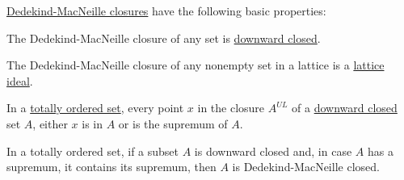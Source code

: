 \begin{proposition}\label{thm:def:dedekind_macnielle_closure}
  \hyperref[def:dedekind_macnielle_completion]{Dedekind-MacNeille closures} have the following basic properties:
  \begin{thmenum}
     The Dedekind-MacNeille closure of any set is \hyperref[def:closed_ordered_subset]{downward closed}.

     The Dedekind-MacNeille closure of any nonempty set in a lattice is a \hyperref[def:lattice_ideal]{lattice ideal}.

     In a \hyperref[def:totally_ordered_set]{totally ordered set}, every point \( x \) in the closure \( A^{UL} \) of a \hyperref[def:closed_ordered_subset]{downward closed} set \( A \), either \( x \) is in \( A \) or is the supremum of \( A \).

     In a totally ordered set, if a subset \( A \) is downward closed and, in case \( A \) has a supremum, it contains its supremum, then \( A \) is Dedekind-MacNeille closed.
  \end{thmenum}
\end{proposition}
